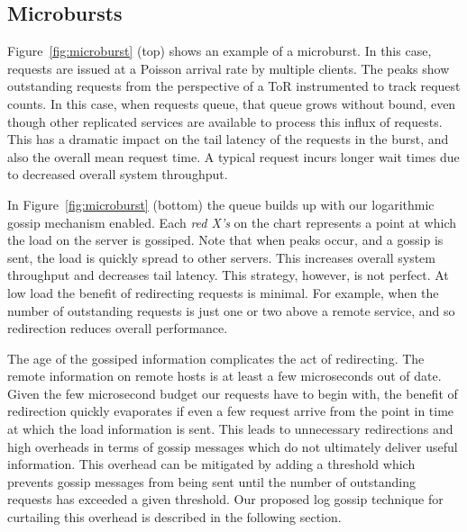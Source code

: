



\subsection{Microbursts}

Figure~\ref{fig:microburst} (top) shows an example of a microburst. In this
case, requests are issued at a Poisson arrival rate by multiple clients.  The
peaks show outstanding requests from the perspective of a ToR instrumented to
track request counts. In this case, when requests queue, that queue grows
without bound, even though other replicated services are available to process
this influx of requests. This has a dramatic impact on the tail latency of the
requests in the burst, and also the overall mean request time. A typical
request incurs longer wait times due to decreased overall system throughput.

In Figure~\ref{fig:microburst} (bottom) the queue builds up with our
logarithmic gossip mechanism enabled. Each \textit{red X's} on the chart
represents a point at which the load on the server is gossiped.  Note that when
peaks occur, and a gossip is sent, the load is quickly spread to other servers.
This increases overall system throughput and decreases tail latency. This
strategy, however, is not perfect. At low load the benefit of redirecting
requests is minimal. For example, when the number of outstanding requests is
just one or two above a remote service, and so redirection reduces overall
performance.

The age of the gossiped information complicates the act of redirecting. The
remote information on remote hosts is at least a few microseconds out of date.
Given the few microsecond budget our requests have to begin with, the benefit
of redirection quickly evaporates if even a few request arrive from the point
in time at which the load information is sent.  This leads to unnecessary
redirections and high overheads in terms of gossip messages which do not
ultimately deliver useful information. This overhead can be mitigated by adding
a threshold which prevents gossip messages from being sent until the number of
outstanding requests has exceeded a given threshold.  Our proposed log gossip
technique for curtailing this overhead is described in the following section.

